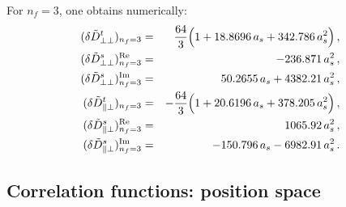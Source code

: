 \documentclass[12pt]{article}
\numberwithin{equation}{section}
\newcommand{\1}[1]{\mathbf{1}^{#1}}
\newcommand{\2}[1]{\mathbf{2}^{#1}}
\newcommand{\3}[1]{\mathbf{3}^{#1}}
\newcommand{\4}[1]{\mathbf{4}^{#1}}
\newcommand{\5}[1]{\mathbf{5}^{#1}}
\newcommand{\tD}{\tilde{D}}
\newcommand{\nnb}{\nonumber}
\newcommand{\TT}{{\perp\perp}}
\newcommand{\PT}{{\parallel\perp}}
\newcommand{\NEQN}[1]{\nnb}
\begin{document}
For $n_f=3$, one obtains numerically:
\begin{eqnarray}
 (\delta \tD^t_\TT)_{n_f=3}&=&\frac{64}{3}\Bigl(1+18.8696 \,a_s +342.786 \, a_s^2 \Bigr)\,, 
\nonumber\\
(\delta \tD^s_\TT)_{n_f=3}^{\text{Re}}  &=&-236.871 \, a_s^2\,,
\nonumber\\
(\delta \tD^s_\TT)_{n_f=3}^{\text{Im}}  &=&50.2655 \,a_s +4382.21 \, a_s^2\,, 
\nonumber\\
(\delta \tD^t_\PT)_{n_f=3}&=&-\frac{64}{3}\Bigl(1+20.6196 \,a_s +378.205 \, a_s^2 \Bigr)\,,
\nonumber\\
(\delta \tD^s_\PT)_{n_f=3}^{\text{Re}}  &=&1065.92 \, a_s^2\,,
\nonumber\\
(\delta \tD^s_\PT)_{n_f=3}^{\text{Im}}  &=&-150.796 \,a_s -6982.91 \, a_s^2\,.
\end{eqnarray}

\subsection{\label{corr:x}Correlation functions: position space}
\end{document}
